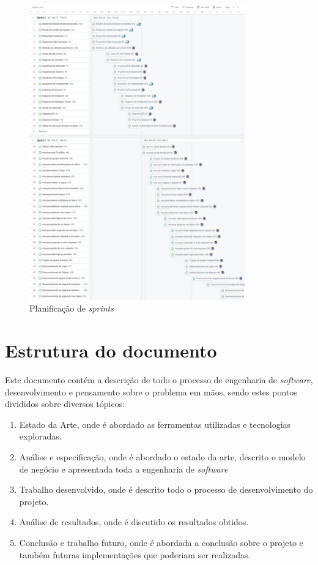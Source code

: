 \begin{figure}[htb]
  \centering
  
  \includegraphics[width=0.83\textwidth]{images/etapa1_sprint_planning.png}
  \caption{Planificação de \textit{sprints}}
  \label{fig:1}
\end{figure}

\section{Estrutura do documento}

Este documento contém a descrição de todo o processo de engenharia de \textit{software}, desenvolvimento e pensamento sobre o problema em mãos, sendo estes pontos divididos sobre diversos tópicos:
\begin{enumerate}
  \item Estado da Arte, onde é abordado as ferramentas utilizadas e tecnologias exploradas.
  \item Análise e especificação, onde é abordado o estado da arte, descrito o modelo de negócio e apresentada toda a engenharia de \textit{software}
  \item Trabalho desenvolvido, onde é descrito todo o processo de desenvolvimento do projeto.
  \item Análise de resultados, onde é discutido os resultados obtidos.
  \item Conclusão e trabalho futuro, onde é abordada a conclusão sobre o projeto e também futuras implementações que poderiam ser realizadas.
\end{enumerate}